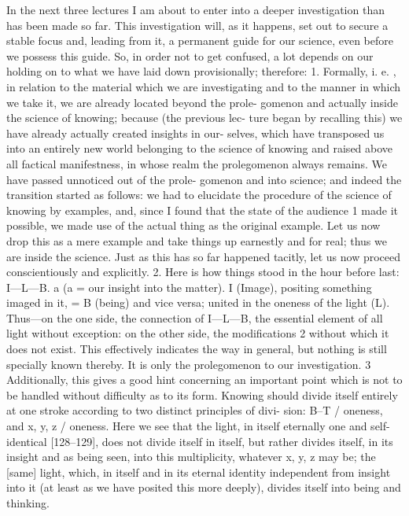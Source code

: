 In the next three lectures I am about to enter into a deeper investigation than
has been made so far.
 This investigation will, as it happens, set out to secure a
stable focus and, leading from it, a permanent guide for our science, even
before we possess this guide.
 So, in order not to get confused, a lot depends
on our holding on to what we have laid down provisionally; therefore:
1.
 Formally, i.
e.
, in relation to the material which we are investigating and
to the manner in which we take it, we are already located beyond the prole-
gomenon and actually inside the science of knowing; because (the previous lec-
ture began by recalling this) we have already actually created insights in our-
selves, which have transposed us into an entirely new world belonging to the
science of knowing and raised above all factical manifestness, in whose realm the
prolegomenon always remains.
 We have passed unnoticed out of the prole-
gomenon and into science; and indeed the transition started as follows: we had
to elucidate the procedure of the science of knowing by examples, and, since I
found that the state of the audience 1 made it possible, we made use of the actual
thing as the original example.
 Let us now drop this as a mere example and take
things up earnestly and for real; thus we are inside the science.
 Just as this has
so far happened tacitly, let us now proceed conscientiously and explicitly.
2.
 Here is how things stood in the hour before last: I—L—B.
 a (a = our
insight into the matter).
 I (Image), positing something imaged in it, = B
(being) and vice versa; united in the oneness of the light (L).
 Thus—on the
one side, the connection of I—L—B, the essential element of all light without
exception: on the other side, the modifications 2 without which it does not exist.
This effectively indicates the way in general, but nothing is still specially
known thereby.
 It is only the prolegomenon to our investigation.
 3
Additionally, this gives a good hint concerning an important point
which is not to be handled without difficulty as to its form.
 Knowing should
divide itself entirely at one stroke according to two distinct principles of divi-
sion: B–T / oneness, and x, y, z / oneness.
 Here we see that the light, in itself
eternally one and self-identical [128–129], does not divide itself in itself, but
rather divides itself, in its insight and as being seen, into this multiplicity,
whatever x, y, z may be; the [same] light, which, in itself and in its eternal
identity independent from insight into it (at least as we have posited this more
deeply), divides itself into being and thinking.
